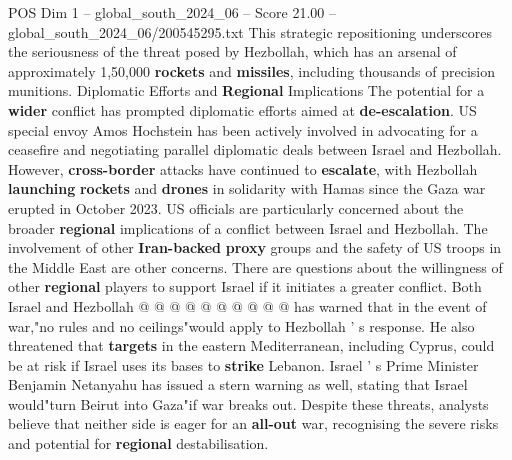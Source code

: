 \begin{textsample}{POS Dim 1 – global\_south\_2024\_06 – Score 21.00 – global\_south\_2024\_06/200545295.txt}
This strategic repositioning underscores the seriousness of the threat posed by Hezbollah, which has an arsenal of approximately 1,50,000 \textbf{rockets} and \textbf{missiles}, including thousands of precision munitions.
Diplomatic Efforts and \textbf{Regional} Implications The potential for a \textbf{wider} conflict has prompted diplomatic efforts aimed at \textbf{de-escalation}.
US special envoy Amos Hochstein has been actively involved in advocating for a ceasefire and negotiating parallel diplomatic deals between Israel and Hezbollah.
However, \textbf{cross-border} attacks have continued to \textbf{escalate}, with Hezbollah \textbf{launching} \textbf{rockets} and \textbf{drones} in solidarity with Hamas since the Gaza war erupted in October 2023.
US officials are particularly concerned about the broader \textbf{regional} implications of a conflict between Israel and Hezbollah.
The involvement of other \textbf{Iran-backed} \textbf{proxy} groups and the safety of US troops in the Middle East are other concerns.
There are questions about the willingness of other \textbf{regional} players to support Israel if it initiates a greater conflict.
Both Israel and Hezbollah @ @ @ @ @ @ @ @ @ @ has warned that in the event of war,"no rules and no ceilings"would apply to Hezbollah ' s response.
He also threatened that \textbf{targets} in the eastern Mediterranean, including Cyprus, could be at risk if Israel uses its bases to \textbf{strike} Lebanon.
Israel ' s Prime Minister Benjamin Netanyahu has issued a stern warning as well, stating that Israel would"turn Beirut into Gaza"if war breaks out.
Despite these threats, analysts believe that neither side is eager for an \textbf{all-out} war, recognising the severe risks and potential for \textbf{regional} destabilisation.

\end{textsample}
